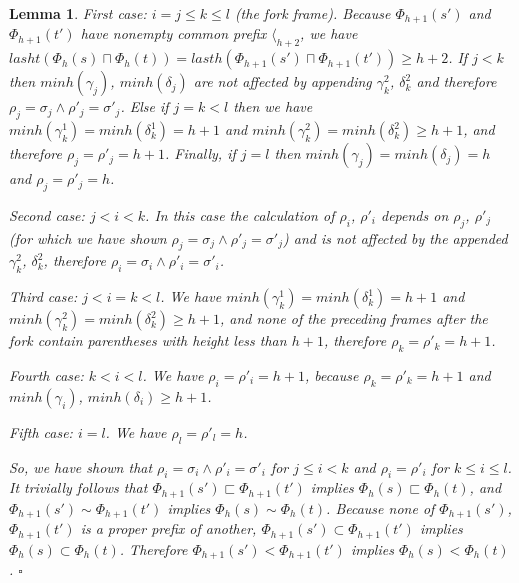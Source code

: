 \documentclass[AMA,STIX1COL]{WileyNJD-v2}
\newcommand{\Xl}{\langle}
\newtheorem{XLem}{Lemma}
\begin{document}
\begin{XLem}
    \medskip

    First case: $i = j \leq k \leq l$ (the fork frame).
    Because $\Phi_{h+1}(s')$ and $\Phi_{h+1}(t')$ have nonempty common prefix $\Xl_{h+2}$,
    we have $lasht (\Phi_{h}(s) \sqcap \Phi_{h}(t)) = lasth (\Phi_{h+1}(s') \sqcap \Phi_{h+1}(t')) \geq h + 2$.
    If $j < k$ then $minh (\gamma_j)$, $minh (\delta_j)$ are not affected by appending
    $\gamma^2_k$, $\delta^2_k$ and therefore $\rho_j = \sigma_j \wedge \rho'_j = \sigma'_j$.
    Else if $j = k < l$ then we have $minh (\gamma^1_k) = minh (\delta^1_k) = h + 1$ and
    $minh (\gamma^2_k) = minh (\delta^2_k) \geq h + 1$, and
    therefore $\rho_j = \rho'_j = h + 1$.
    Finally, if $j = l$ then $minh (\gamma_j) = minh (\delta_j) = h$ and $\rho_j = \rho'_j = h$.

    \medskip

    Second case: $j < i < k$.
    In this case the calculation of $\rho_i$, $\rho'_i$ depends on $\rho_j$, $\rho'_j$
    (for which we have shown $\rho_j = \sigma_j \wedge \rho'_j = \sigma'_j$) and
    is not affected by the appended $\gamma^2_k$, $\delta^2_k$, therefore
    $\rho_i = \sigma_i \wedge \rho'_i = \sigma'_i$.

    \medskip

    Third case: $j < i = k < l$. We have
    $minh (\gamma^1_k) = minh (\delta^1_k) = h + 1$ and
    $minh (\gamma^2_k) = minh (\delta^2_k) \geq h + 1$,
    and none of the preceding frames after the fork contain parentheses with height less than $h + 1$,
    therefore $\rho_k = \rho'_k = h + 1$.

    \medskip

    Fourth case: $k < i < l$.
    We have $\rho_i = \rho'_i = h + 1$,
    because $\rho_k = \rho'_k = h + 1$ and $minh(\gamma_i)$, $minh(\delta_i) \geq h + 1$.

    \medskip

    Fifth case: $i = l$.
    We have $\rho_l = \rho'_l = h$.

    \medskip

    So, we have shown that $\rho_i = \sigma_i \wedge \rho'_i = \sigma'_i$ for $j \leq i < k$
    and $\rho_i = \rho'_i$ for $k \leq i \leq l$.
    It trivially follows that $\Phi_{h+1}(s') \sqsubset \Phi_{h+1}(t')$ implies $\Phi_{h}(s) \sqsubset \Phi_{h}(t)$, and
    $\Phi_{h+1}(s') \sim \Phi_{h+1}(t')$ implies $\Phi_{h}(s) \sim \Phi_{h}(t)$.
    Because none of $\Phi_{h+1}(s')$, $\Phi_{h+1}(t')$ is a proper prefix of another,
    $\Phi_{h+1}(s') \subset \Phi_{h+1}(t')$ implies $\Phi_{h}(s) \subset \Phi_{h}(t)$.
    Therefore $\Phi_{h+1}(s') < \Phi_{h+1}(t')$ implies $\Phi_{h}(s) < \Phi_{h}(t)$.
    $\square$
    \end{XLem}
\end{document}
